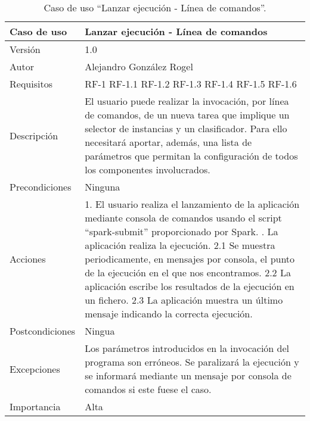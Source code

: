 \begin{table}
  \begin{center}
   \begin{tabular}{|>{} L{3cm} | L{9cm} |}
    \hline
    Caso de uso & Lanzar ejecución - Línea de comandos\\
    \hline
    Versión & 1.0 \\
    \hline
    Autor & Alejandro González Rogel \\
    \hline
    Requisitos & RF-1\newline
		RF-1.1\newline
		RF-1.2\newline
		RF-1.3\newline
		RF-1.4\newline
		RF-1.5\newline
		RF-1.6\\
    \hline
    Descripción & El usuario puede realizar la invocación, por línea de comandos, de un nueva tarea que implique un selector de instancias y un clasificador. Para ello necesitará aportar, además, una lista de parámetros que permitan la configuración de todos los componentes involucrados.\\
    \hline
    Precondiciones & Ninguna \\
    \hline
    Acciones & 1. El usuario realiza el lanzamiento de la aplicación mediante consola de comandos usando el script ``spark-submit'' proporcionado por Spark. . La aplicación realiza la ejecución. \newline
    \hspace{1em} 2.1 Se muestra periodicamente, en mensajes por consola, el punto de la ejecución en el que nos encontramos. \newline
    \hspace{1em} 2.2 La aplicación escribe los resultados de la ejecución en un fichero.\newline
    \hspace{1em} 2.3 La aplicación muestra un último mensaje indicando la correcta ejecución.\\
    \hline
    Postcondiciones & Ningua \\
    \hline
    Excepciones & Los parámetros introducidos en la invocación del programa son erróneos. Se paralizará la ejecución y se informará mediante un mensaje por consola de comandos si este fuese el caso. \\
    \hline
    Importancia & Alta \\
    \hline
   \end{tabular}
   \caption{Caso de uso ``Lanzar ejecución - Línea de comandos''.}
   \label{tabla:casoUso1}
  \end{center}
 \end{table} 
 
